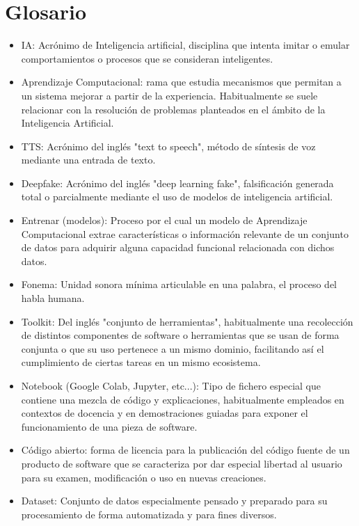 \section{Glosario}

\begin{itemize}
    
\item IA: Acrónimo de Inteligencia artificial, disciplina que intenta imitar o emular comportamientos o procesos que se consideran inteligentes. 

\item Aprendizaje Computacional: rama que estudia mecanismos que permitan a un sistema mejorar a partir de la experiencia. Habitualmente se suele relacionar con la resolución de problemas planteados en el ámbito de la Inteligencia Artificial.

\item TTS: Acrónimo del inglés "text to speech", método de síntesis de voz mediante una entrada de texto.

\item Deepfake: Acrónimo del inglés "deep learning fake", falsificación generada total o parcialmente mediante el uso de modelos de inteligencia artificial.

\item Entrenar (modelos): Proceso por el cual un modelo de Aprendizaje Computacional extrae características o información relevante de un conjunto de datos para adquirir alguna capacidad funcional relacionada con dichos datos.

\item Fonema: Unidad sonora mínima articulable en una palabra, el proceso del habla humana.

\item Toolkit: Del inglés "conjunto de herramientas", habitualmente una recolección de distintos componentes de software o herramientas que se usan de forma conjunta o que su uso pertenece a un mismo dominio, facilitando así el cumplimiento de ciertas tareas en un mismo ecosistema.

\item Notebook (Google Colab, Jupyter, etc...): Tipo de fichero especial que contiene una mezcla de código y explicaciones, habitualmente empleados en contextos de docencia y en demostraciones guiadas para exponer el funcionamiento de una pieza de software.

\item Código abierto: forma de licencia para la publicación del código fuente de un producto de software que se caracteriza por dar especial libertad al usuario para su examen, modificación o uso en nuevas creaciones.

\item Dataset: Conjunto de datos especialmente pensado y preparado para su procesamiento de forma automatizada y para fines diversos. 



\end{itemize}
\newpage 

\listoffigures

\newpage 